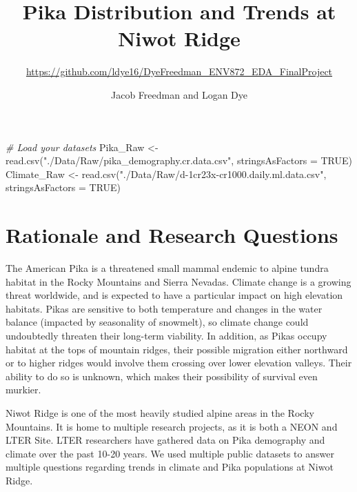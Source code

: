 \documentclass[
  12pt,
]{article}
\title{Pika Distribution and Trends at Niwot Ridge}
\subtitle{\url{https://github.com/ldye16/DyeFreedman_ENV872_EDA_FinalProject}}
\author{Jacob Freedman and Logan Dye}
\date{}
\newenvironment{Shaded}{\begin{snugshade}}{\end{snugshade}}
\newcommand{\AttributeTok}[1]{\textcolor[rgb]{0.77,0.63,0.00}{#1}}
\newcommand{\CommentTok}[1]{\textcolor[rgb]{0.56,0.35,0.01}{\textit{#1}}}
\newcommand{\ConstantTok}[1]{\textcolor[rgb]{0.00,0.00,0.00}{#1}}
\newcommand{\FunctionTok}[1]{\textcolor[rgb]{0.00,0.00,0.00}{#1}}
\newcommand{\NormalTok}[1]{#1}
\newcommand{\OtherTok}[1]{\textcolor[rgb]{0.56,0.35,0.01}{#1}}
\newcommand{\StringTok}[1]{\textcolor[rgb]{0.31,0.60,0.02}{#1}}
\begin{document}
\maketitle

\newpage
\tableofcontents 
\newpage
\listoftables 
\newpage
\listoffigures 
\newpage

\begin{Shaded}
\begin{Highlighting}[]
\CommentTok{\# Load your datasets}
\NormalTok{Pika\_Raw }\OtherTok{\textless{}{-}} \FunctionTok{read.csv}\NormalTok{(}\StringTok{"./Data/Raw/pika\_demography.cr.data.csv"}\NormalTok{,}
    \AttributeTok{stringsAsFactors =} \ConstantTok{TRUE}\NormalTok{)}
\NormalTok{Climate\_Raw }\OtherTok{\textless{}{-}} \FunctionTok{read.csv}\NormalTok{(}\StringTok{"./Data/Raw/d{-}1cr23x{-}cr1000.daily.ml.data.csv"}\NormalTok{,}
    \AttributeTok{stringsAsFactors =} \ConstantTok{TRUE}\NormalTok{)}
\end{Highlighting}
\end{Shaded}

\hypertarget{rationale-and-research-questions}{%
\section{Rationale and Research
Questions}\label{rationale-and-research-questions}}

The American Pika is a threatened small mammal endemic to alpine tundra
habitat in the Rocky Mountains and Sierra Nevadas. Climate change is a
growing threat worldwide, and is expected to have a particular impact on
high elevation habitats. Pikas are sensitive to both temperature and
changes in the water balance (impacted by seasonality of snowmelt), so
climate change could undoubtedly threaten their long-term viability. In
addition, as Pikas occupy habitat at the tops of mountain ridges, their
possible migration either northward or to higher ridges would involve
them crossing over lower elevation valleys. Their ability to do so is
unknown, which makes their possibility of survival even murkier.

Niwot Ridge is one of the most heavily studied alpine areas in the Rocky
Mountains. It is home to multiple research projects, as it is both a
NEON and LTER Site. LTER researchers have gathered data on Pika
demography and climate over the past 10-20 years. We used multiple
public datasets to answer multiple questions regarding trends in climate
and Pika populations at Niwot Ridge.
\end{document}
